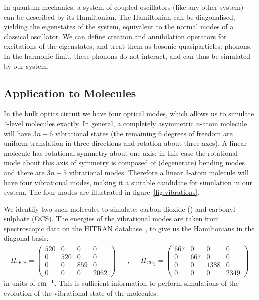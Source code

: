 In quantum mechanics, a system of coupled oscillators (like any other system)
can be described by its Hamiltonian. The Hamiltonian can be diagonalised,
yielding the eigenstates of the system, equivalent to the normal modes of a
classical oscillator. We can define creation and annihilation operators for
excitations of the eigenstates, and treat them as bosonic quasiparticles:
phonons. In the harmonic limit, these phonons do not interact, and can thus be
simulated by our system.

\subsection{Application to Molecules}
In the bulk optics circuit we have four optical modes, which allows us to
simulate 4-level molecules
exactly. In general, a completely asymmetric \(n\)-atom molecule will have \(3
n-6\) vibrational states (the remaining 6 degrees of freedom are
uniform translation in three directions and rotation about three axes). A linear
molecule has rotational symmetry about one axis; in this case the rotational
mode about this axis of symmetry is composed of (degenerate) bending modes and
there are \(3n - 5\) vibrational modes. Therefore a linear 3-atom molecule will
have four vibrational modes, making it a suitable candidate for simulation in
our system. The four modes are illustrated in figure~\ref{fig:vibrations}.

We identify two such molecules to simulate: carbon dioxide (\co{}) and carbonyl
sulphate (OCS). The energies of the vibrational modes are taken from
spectroscopic data on the HITRAN database~\cite{hitran}, to give us the
Hamiltonians in the diagonal basis:
\begin{align}
  H_{\text{OCS}} = \begin{pmatrix}
    520 & 0 & 0 & 0 \\
    0 & 520 & 0 & 0 \\
    0 & 0 & 859 & 0 \\
    0 & 0 & 0 & 2062 \end{pmatrix} && , && H_{\text{CO}_{2}} = \begin{pmatrix}
    667 & 0 & 0 & 0 \\
    0 & 667 & 0 & 0 \\
    0 & 0 & 1388 & 0 \\
    0 & 0 & 0 & 2349 \end{pmatrix}
\end{align}
in units of \(\text{cm}^{-1}\). This is sufficient information to perform simulations
of the evolution of the vibrational state of the molecules.

